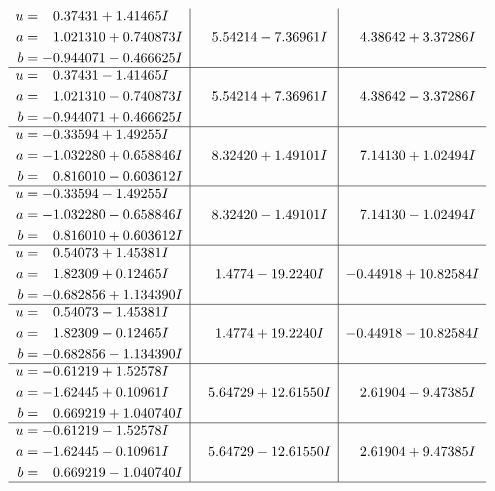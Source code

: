 \documentclass[1p]{elsarticle_modified}
\theoremstyle{definition}
\begin{document}
$$\begin{array}{c|c|c}
\begin{aligned}
u &= \phantom{-}0.37431 + 1.41465 I \\
a &= \phantom{-}1.021310 + 0.740873 I \\
b &= -0.944071 - 0.466625 I\end{aligned}
 & \phantom{-}5.54214 - 7.36961 I & \phantom{-}4.38642 + 3.37286 I \\ \hline\begin{aligned}
u &= \phantom{-}0.37431 - 1.41465 I \\
a &= \phantom{-}1.021310 - 0.740873 I \\
b &= -0.944071 + 0.466625 I\end{aligned}
 & \phantom{-}5.54214 + 7.36961 I & \phantom{-}4.38642 - 3.37286 I \\ \hline\begin{aligned}
u &= -0.33594 + 1.49255 I \\
a &= -1.032280 + 0.658846 I \\
b &= \phantom{-}0.816010 - 0.603612 I\end{aligned}
 & \phantom{-}8.32420 + 1.49101 I & \phantom{-}7.14130 + 1.02494 I \\ \hline\begin{aligned}
u &= -0.33594 - 1.49255 I \\
a &= -1.032280 - 0.658846 I \\
b &= \phantom{-}0.816010 + 0.603612 I\end{aligned}
 & \phantom{-}8.32420 - 1.49101 I & \phantom{-}7.14130 - 1.02494 I \\ \hline\begin{aligned}
u &= \phantom{-}0.54073 + 1.45381 I \\
a &= \phantom{-}1.82309 + 0.12465 I \\
b &= -0.682856 + 1.134390 I\end{aligned}
 & \phantom{-}1.4774 - 19.2240 I & -0.44918 + 10.82584 I \\ \hline\begin{aligned}
u &= \phantom{-}0.54073 - 1.45381 I \\
a &= \phantom{-}1.82309 - 0.12465 I \\
b &= -0.682856 - 1.134390 I\end{aligned}
 & \phantom{-}1.4774 + 19.2240 I & -0.44918 - 10.82584 I \\ \hline\begin{aligned}
u &= -0.61219 + 1.52578 I \\
a &= -1.62445 + 0.10961 I \\
b &= \phantom{-}0.669219 + 1.040740 I\end{aligned}
 & \phantom{-}5.64729 + 12.61550 I & \phantom{-}2.61904 - 9.47385 I \\ \hline\begin{aligned}
u &= -0.61219 - 1.52578 I \\
a &= -1.62445 - 0.10961 I \\
b &= \phantom{-}0.669219 - 1.040740 I\end{aligned}
 & \phantom{-}5.64729 - 12.61550 I & \phantom{-}2.61904 + 9.47385 I\\
 \hline 
 \end{array}$$\newpage\newpage\renewcommand{\arraystretch}{1}
\end{document}
